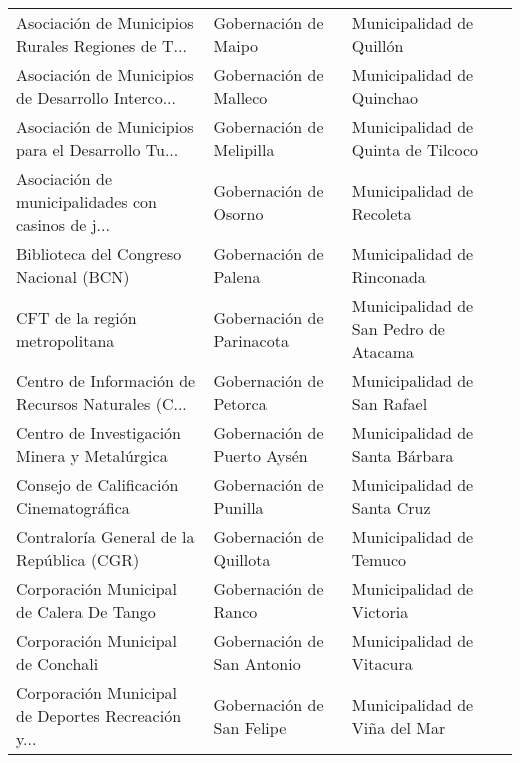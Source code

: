 \documentclass[11pt]{article}
\begin{document}
\begin{longtable}{ p{5cm} | p{5cm} | p{5cm} }
 Asociación de Municipios Rurales Regiones de T... &                               Gobernación de Maipo &                           Municipalidad de Quillón \\
 Asociación de Municipios de Desarrollo Interco... &                             Gobernación de Malleco &                          Municipalidad de Quinchao \\
 Asociación de Municipios para el Desarrollo Tu... &                           Gobernación de Melipilla &                 Municipalidad de Quinta de Tilcoco \\
 Asociación de municipalidades con casinos de j... &                              Gobernación de Osorno &                          Municipalidad de Recoleta \\
            Biblioteca del Congreso Nacional (BCN) &                              Gobernación de Palena &                         Municipalidad de Rinconada \\
                    CFT de la región metropolitana &                          Gobernación de Parinacota &              Municipalidad de San Pedro de Atacama \\
 Centro de Información de Recursos Naturales (C... &                             Gobernación de Petorca &                        Municipalidad de San Rafael \\
      Centro de Investigación Minera y Metalúrgica &                        Gobernación de Puerto Aysén &                     Municipalidad de Santa Bárbara \\
           Consejo de Calificación Cinematográfica &                             Gobernación de Punilla &                        Municipalidad de Santa Cruz \\
         Contraloría General de la República (CGR) &                            Gobernación de Quillota &                            Municipalidad de Temuco \\
          Corporación Municipal de Calera De Tango &                               Gobernación de Ranco &                          Municipalidad de Victoria \\
                 Corporación Municipal de Conchali &                         Gobernación de San Antonio &                          Municipalidad de Vitacura \\
 Corporación Municipal de Deportes Recreación y... &                          Gobernación de San Felipe &                      Municipalidad de Viña del Mar \\

\end{longtable}
\end{document}
